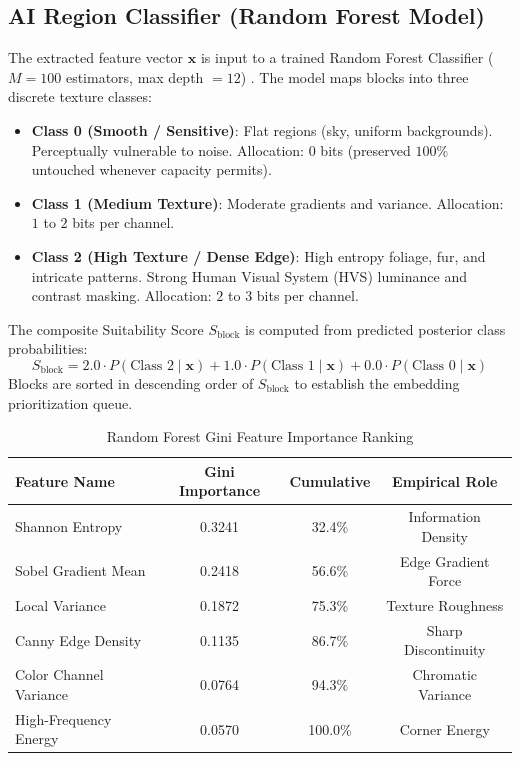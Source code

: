 \documentclass[conference]{IEEEtran}
\begin{document}
\subsection{AI Region Classifier (Random Forest Model)}
The extracted feature vector $\mathbf{x}$ is input to a trained Random Forest Classifier ($M=100$ estimators, max depth $=12$) \cite{breiman2001random}. The model maps blocks into three discrete texture classes:
\begin{itemize}
    \item \textbf{Class 0 (Smooth / Sensitive)}: Flat regions (sky, uniform backgrounds). Perceptually vulnerable to noise. Allocation: $0$ bits (preserved $100\%$ untouched whenever capacity permits).
    \item \textbf{Class 1 (Medium Texture)}: Moderate gradients and variance. Allocation: $1$ to $2$ bits per channel.
    \item \textbf{Class 2 (High Texture / Dense Edge)}: High entropy foliage, fur, and intricate patterns. Strong Human Visual System (HVS) luminance and contrast masking. Allocation: $2$ to $3$ bits per channel.
\end{itemize}

The composite Suitability Score $S_{\text{block}}$ is computed from predicted posterior class probabilities:
\begin{equation}
    S_{\text{block}} = 2.0 \cdot P(\text{Class } 2 \mid \mathbf{x}) + 1.0 \cdot P(\text{Class } 1 \mid \mathbf{x}) + 0.0 \cdot P(\text{Class } 0 \mid \mathbf{x})
\end{equation}
Blocks are sorted in descending order of $S_{\text{block}}$ to establish the embedding prioritization queue.

\begin{table}[htbp]
\caption{Random Forest Gini Feature Importance Ranking}
\label{tab:gini}
\centering
\begin{tabular}{@{}lccc@{}}
\toprule
\textbf{Feature Name} & \textbf{Gini Importance} & \textbf{Cumulative} & \textbf{Empirical Role} \\
\midrule
Shannon Entropy        & 0.3241 & 32.4\% & Information Density \\
Sobel Gradient Mean    & 0.2418 & 56.6\% & Edge Gradient Force \\
Local Variance         & 0.1872 & 75.3\% & Texture Roughness \\
Canny Edge Density     & 0.1135 & 86.7\% & Sharp Discontinuity \\
Color Channel Variance & 0.0764 & 94.3\% & Chromatic Variance \\
High-Frequency Energy  & 0.0570 & 100.0\% & Corner Energy \\
\bottomrule
\end{tabular}
\end{table}
\end{document}
